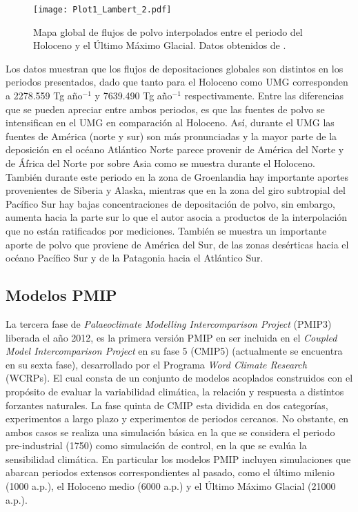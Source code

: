 \begin{figure}[H]
\centering
 \texttt{[image: Plot1\_Lambert\_2.pdf]}
 \caption[Flujos de polvo \cite{lambert2015dust}]{Mapa global de flujos de polvo interpolados entre el periodo del Holoceno y el \'Ultimo M\'aximo Glacial. Datos obtenidos de \cite{lambert2015dust}.}
  \label{fig:Mapa_Lambert}\end{figure}

Los datos muestran que los flujos de depositaciones globales son distintos en los periodos presentados, dado que tanto para el Holoceno como UMG corresponden a 2278.559 Tg año$^{-1}$ y 7639.490 Tg año$^{-1}$ respectivamente. Entre las diferencias que se pueden apreciar entre ambos periodos, es que las fuentes de polvo se intensifican en el UMG en comparación al Holoceno. Así, durante el UMG las fuentes de América (norte y sur) son más pronunciadas y la mayor parte de la deposición en el océano Atlántico Norte parece provenir de América del Norte y de África del Norte por sobre Asia como se muestra durante el Holoceno. También durante este periodo en la zona de Groenlandia hay importante aportes provenientes de Siberia y Alaska, mientras que en la zona del giro subtropial del Pacífico Sur hay bajas concentraciones de depositación de polvo, sin embargo, aumenta hacia la parte sur lo que el autor asocia a productos de la interpolación que no están ratificados por mediciones. También se muestra un importante aporte de polvo que proviene de América del Sur, de las zonas desérticas hacia el océano Pacífico Sur y de la Patagonia hacia el Atlántico Sur. 

\subsection{Modelos PMIP}

La tercera fase de \textit{Palaeoclimate Modelling Intercomparison Project} (PMIP3) liberada el año 2012, es la primera versión PMIP en ser incluida en el \textit{Coupled Model Intercomparison Project} en su fase 5 (CMIP5) (actualmente se encuentra en su sexta fase), desarrollado por el Programa \textit{Word Climate Research} (WCRPs). El cual consta de un conjunto de modelos acoplados construidos con el propósito de evaluar la variabilidad climática, la relación y respuesta a distintos forzantes naturales. La fase quinta de CMIP esta dividida en dos categorías, experimentos a largo plazo y experimentos de periodos cercanos. No obstante, en ambos casos se realiza una simulación básica en la que se considera el periodo pre-industrial (1750) como simulación de control, en la que se evalúa la sensibilidad climática. En particular los modelos PMIP incluyen simulaciones que abarcan periodos extensos correspondientes al pasado, como el \'ultimo milenio (1000 a.p.), el Holoceno medio (6000 a.p.) y el \'Ultimo M\'aximo Glacial (21000 a.p.).


